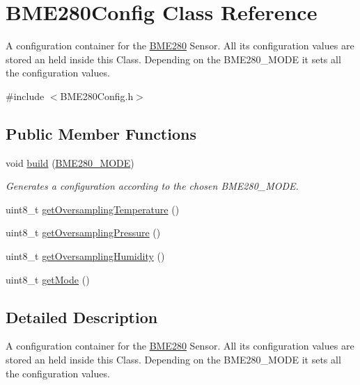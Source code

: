 \hypertarget{class_b_m_e280_config}{}\section{B\+M\+E280\+Config Class Reference}
\label{class_b_m_e280_config}


A configuration container for the \hyperlink{class_b_m_e280}{B\+M\+E280} Sensor. All its configuration values are stored an held inside this Class. Depending on the B\+M\+E280\+\_\+\+M\+O\+D\+E it sets all the configuration values.  




{\ttfamily \#include $<$B\+M\+E280\+Config.\+h$>$}

\subsection*{Public Member Functions}
\begin{DoxyCompactItemize}
\item 
void \hyperlink{class_b_m_e280_config_a7c04196811432e07cb2f0963b5fb8894}{build} (\hyperlink{_b_m_e280_config_8h_adbe608ebe4835999264df777979ca834}{B\+M\+E280\+\_\+\+M\+O\+D\+E})
\begin{DoxyCompactList}\small\item\em Generates a configuration according to the chosen B\+M\+E280\+\_\+\+M\+O\+D\+E. \end{DoxyCompactList}\item 
uint8\+\_\+t \hyperlink{class_b_m_e280_config_aaa2fd7e69315df6f8b6f632927540e4e}{get\+Oversampling\+Temperature} ()
\item 
uint8\+\_\+t \hyperlink{class_b_m_e280_config_a22308ba28db458a49462d6367abef94a}{get\+Oversampling\+Pressure} ()
\item 
uint8\+\_\+t \hyperlink{class_b_m_e280_config_a25d660eda8d0b1ebdf6459c184c4e805}{get\+Oversampling\+Humidity} ()
\item 
uint8\+\_\+t \hyperlink{class_b_m_e280_config_abf3314c5259e3021448a1c422412538b}{get\+Mode} ()
\end{DoxyCompactItemize}


\subsection{Detailed Description}
A configuration container for the \hyperlink{class_b_m_e280}{B\+M\+E280} Sensor. All its configuration values are stored an held inside this Class. Depending on the B\+M\+E280\+\_\+\+M\+O\+D\+E it sets all the configuration values. 

